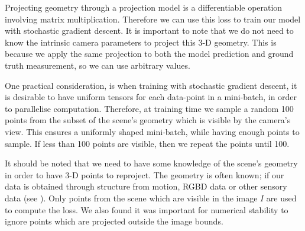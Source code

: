 Projecting geometry through a projection model is a differentiable operation involving matrix multiplication. Therefore we can use this loss to train our model with stochastic gradient descent. It is important to note that we do not need to know the intrinsic camera parameters to project this 3-D geometry. This is because we apply the same projection to both the model prediction and ground truth measurement, so we can use arbitrary values.

One practical consideration, is when training with stochastic gradient descent, it is desirable to have uniform tensors for each data-point in a mini-batch, in order to parallelise computation. Therefore, at training time we sample a random 100 points from the subset of the scene's geometry which is visible by the camera's view. This ensures a uniformly shaped mini-batch, while having enough points to sample. If less than 100 points are visible, then we repeat the points until 100.

It should be noted that we need to have some knowledge of the scene's geometry in order to have 3-D points to reproject. The geometry is often known; if our data is obtained through structure from motion, RGBD data or other sensory data (see ). Only points from the scene which are visible in the image $I$ are used to compute the loss. We also found it was important for numerical stability to ignore points which are projected outside the image bounds.

